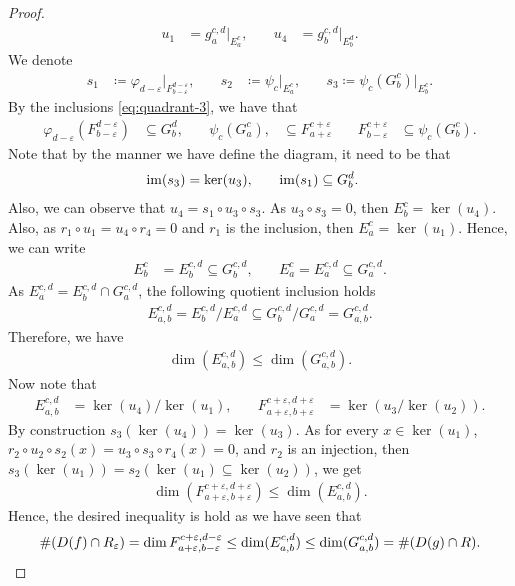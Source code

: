 \begin{proof}
\begin{align}
    u_1 &= g_a^{c,d}\rvert_{E_a^c}, \quad & u_4 &= g_b^{c,d}\rvert_{E_b^d}.
\end{align}
We denote
\begin{align}
    s_1 &\coloneq \varphi_{d-\varepsilon}\rvert_{F_{b-\varepsilon}^{d-\varepsilon}}, \quad & s_2 &\coloneq \psi_c\rvert_{E_a^c}, \quad & s_3 \coloneq \psi_c(G_b^c)\rvert_{E_b^c}.
\end{align}
By the inclusions \eqref{eq:quadrant-3}, we have that
\begin{align}
    \varphi_{d-\varepsilon}(F_{b-\varepsilon}^{d-\varepsilon}) &\subseteq G_b^d, \quad & \psi_c(G_a^c), &\subseteq F_{a+\varepsilon}^{c+\varepsilon} \quad & F_{b-\varepsilon}^{c+\varepsilon} &\subseteq \psi_c(G_b^c).
\end{align}
Note that by the manner we have define the diagram, it need to be that
\begin{align}
    \operatorname{im}(s_3) &= \ker(u_3), \quad & \operatorname{im}(s_1) &\subseteq G_b^d.
\end{align}
Also, we can observe that $ u_4 = s_1 \circ u_3 \circ s_3 $. As $ u_3 \circ s_3 = 0 $, then $ E_b^c = \ker(u_4) $. Also, as $ r_1 \circ u_1 = u_4 \circ r_4 = 0 $ and $ r_1 $ is the inclusion, then $ E_a^c = \ker(u_1) $. Hence, we can write
\begin{align}
    E_b^c &= E_b^{c,d} \subseteq G_b^{c,d}, \quad & E_a^c = E_a^{c,d} \subseteq G_a^{c,d}.
\end{align}  
As $ E_a^{c,d} = E_b^{c,d} \cap G_a^{c,d} $, the following quotient inclusion holds
\begin{align}
    E_{a,b}^{c,d} = E_b^{c,d} / E_a^{c,d} \subseteq G_b^{c,d} / G_a^{c,d} = G_{a,b}^{c,d}.
\end{align}
Therefore, we have
\begin{align}
    \dim(E_{a,b}^{c,d}) \leq \dim(G_{a,b}^{c,d}).
\end{align}
Now note that
\begin{align}
    E_{a,b}^{c,d} &= \ker(u_4) / \ker(u_1), \quad & F_{a+\varepsilon, b+\varepsilon}^{c+\varepsilon, d+\varepsilon} &= \ker(u_3 / \ker(u_2)).
\end{align}
By construction $s_3(\ker(u_4)) = \ker(u_3) $. As for every $x \in \ker(u_1)$, $r_2 \circ u_2 \circ s_2 (x) = u_3 \circ s_3 \circ r_4 (x) = 0 $, and $r_2 $ is an injection, then $ s_3(\ker(u_1)) = s_2(\ker(u_1) \subseteq \ker(u_2))$, we get 
\begin{align}
    \dim(F_{a+\varepsilon, b+\varepsilon}^{c+\varepsilon, d+\varepsilon}) \leq \dim(E_{a,b}^{c,d}).
\end{align}
Hence, the desired inequality is hold as we have seen that
\begin{align}
    \#(D(f) \cap R_\varepsilon) = \dim F_{a+\varepsilon, b-\varepsilon}^{c+\varepsilon, d-\varepsilon} \leq \dim(E_{a,b}^{c,d}) \leq \dim(G_{a,b}^{c,d}) = \#(D(g) \cap R).
\end{align}
\end{proof}

